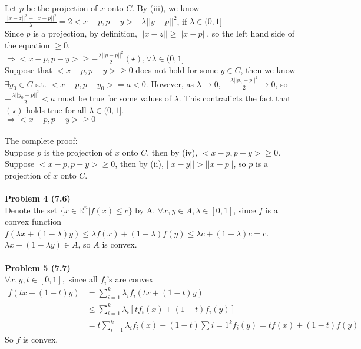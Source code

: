 \documentclass[letterpaper,12pt]{article}
\theoremstyle{definition}
\begin{document}
Let $p$ be the projection of $x$ onto $C$. By (iii), we know\\
$\frac{||x-z||^2-||x-p||^2}{\lambda} = 2<x-p, p-y>+\lambda||y-p||^2$, if $\lambda \in (0, 1]$\\
Since $p$ is a projection, by definition, $||x-z||\geq ||x-p||$, so the left hand side of the equation $\geq 0$.\\
$\Rightarrow <x-p, p-y> \geq -\frac{\lambda||y-p||^2}{2}(\star), \forall \lambda\in (0, 1]$\\
Suppose that $<x-p, p-y>\geq 0$ does not hold for some $y\in C$, then we know $\exists y_0\in C$ s.t. $<x-p, p-y_0> = a<0$. However, as $\lambda\rightarrow 0$, $-\frac{\lambda||y_0-p||^2}{2}\rightarrow 0$, so $-\frac{\lambda||y_0-p||^2}{2}<a$ must be true for some values of $\lambda$. This contradicts the fact that $(\star)$ holds true for all $\lambda \in (0,1]$.  \\
$\Rightarrow <x-p, p-y>\geq 0$\\
\\
The complete proof:\\
Suppose $p$ is the projection of $x$ onto $C$, then by (iv), $<x-p, p-y>\geq 0$.\\
Suppose $<x-p, p-y>\geq 0$, then by (ii), $||x-y||>||x-p||$, so $p$ is a projection of $x$ onto $C$.\\
\\
\noindent\textbf{Problem 4 (7.6)} \\
Denote the set $\{x\in \mathbb{R}^n|f(x)\leq c\}$ by A. $\forall x, y\in A, \lambda\in [0, 1]$, since $f$ is a convex function\\
$f(\lambda x + (1-\lambda) y)\leq \lambda f(x) + (1-\lambda)f(y) \leq \lambda c + (1-\lambda)c = c$.\\
$\lambda x + (1-\lambda y)\in A$, so $A$ is convex.\\
\\
\noindent\textbf{Problem 5 (7.7)} \\
$\forall x, y, t\in [0,1],$ since all $f_i$'s are convex\\
\begin{align*}
f(tx + (1-t)y) &= \sum_{i=1}^k \lambda_if_i(tx+(1-t)y)\\
&\leq \sum_{i=1}^k \lambda_i[tf_i(x) + (1-t)f_i(y)]\\
&= t\sum_{i=1}^k \lambda_i f_i(x)+(1-t)\sum{i=1}^k f_i(y) = tf(x)+(1-t)f(y)
\end{align*}
So $f$ is convex.\\
\\
\end{document}

